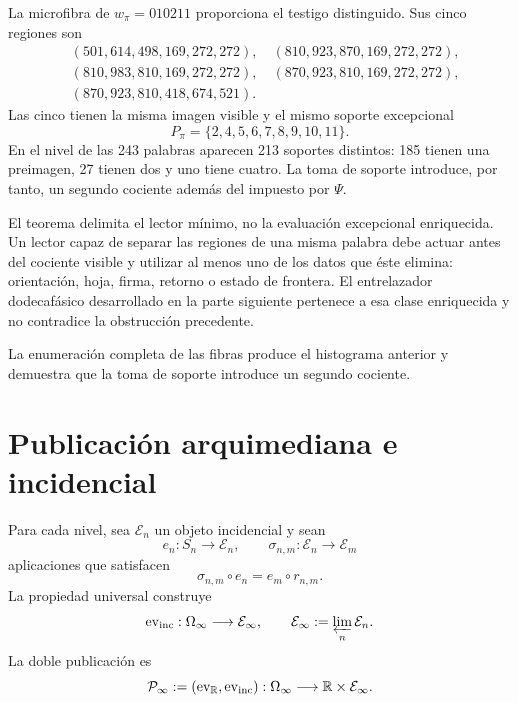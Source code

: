La microfibra de \(w_\pi=010211\) proporciona el testigo distinguido. Sus
cinco regiones son
\[
\begin{split}
 &(501,614,498,169,272,272),\quad
 (810,923,870,169,272,272),\\
 &(810,983,810,169,272,272),\quad
 (870,923,810,169,272,272),\\
 &(870,923,810,418,674,521).
\end{split}
\]
Las cinco tienen la misma imagen visible y el mismo soporte excepcional
\[
 P_\pi=\{2,4,5,6,7,8,9,10,11\}.
\]
En el nivel de las 243 palabras aparecen 213 soportes distintos: 185 tienen
una preimagen, 27 tienen dos y uno tiene cuatro. La toma de soporte introduce,
por tanto, un segundo cociente además del impuesto por \(\Psi\).

El teorema delimita el lector mínimo, no la evaluación excepcional
enriquecida. Un lector capaz de separar las regiones de una misma palabra
debe actuar antes del cociente visible y utilizar al menos uno de los datos
que éste elimina: orientación, hoja, firma, retorno o estado de frontera. El
entrelazador dodecafásico desarrollado en la parte siguiente pertenece a esa
clase enriquecida y no contradice la obstrucción precedente.

La enumeración completa de las fibras produce el histograma anterior y
demuestra que la toma de soporte introduce un segundo cociente.


\section{Publicación arquimediana e incidencial}

Para cada nivel, sea \(\mathcal E_n\) un objeto incidencial y sean
\begin{equation}
 e_n:S_n\longrightarrow\mathcal E_n,
 \qquad
 \sigma_{n,m}:\mathcal E_n\longrightarrow\mathcal E_m
 \label{p12-83-c17-s5:eq:datos-lector-incidencial-u024}
\end{equation}
aplicaciones que satisfacen
\begin{equation}
 \sigma_{n,m}\circ e_n=e_m\circ r_{n,m}.
 \label{p12-83-c17-s5:eq:naturalidad-lector-incidencial-u024}
\end{equation}
La propiedad universal construye
\begin{equation}
 \operatorname{ev}_{\rm inc}:\Omega_\infty
 \longrightarrow\mathcal E_\infty,
 \qquad
 \mathcal E_\infty:=\varprojlim_n\mathcal E_n.
 \label{p12-83-c17-s5:eq:evaluacion-incidencial-limite-u024}
\end{equation}
La doble publicación es
\begin{equation}
 \mathcal P_\infty
 :=(\operatorname{ev}_{\mathbb R},\operatorname{ev}_{\rm inc}):
 \Omega_\infty\longrightarrow\mathbb R\times\mathcal E_\infty.
 \label{p12-83-c17-s5:eq:doble-publicacion-continuo-u024}
\end{equation}

